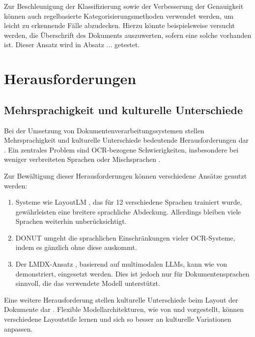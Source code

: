 Zur Beschleunigung der Klassifizierung sowie der Verbesserung der Genauigkeit können auch regelbasierte Kategorisierungsmethoden verwendet werden, um leicht zu erkennende Fälle abzudecken. Hierzu könnte beispielsweise versucht werden, die Überschrift des Dokuments auszuwerten, sofern eine solche vorhanden ist. Dieser Ansatz wird in Absatz ... getestet.

\section{Herausforderungen}
\label{sec:herausforderungen-und-offene-probleme}

\subsection{Mehrsprachigkeit und kulturelle Unterschiede}
\label{subsec:mehrsprachigkeit-und-kulturelle-unterschiede}

Bei der Umsetzung von Dokumentenverarbeitungssystemen stellen Mehrsprachigkeit und kulturelle Unterschiede bedeutende Herausforderungen dar \cite{XuYiheng2020LPoT, SubramaniNishant2021ASoD}. Ein zentrales Problem sind \gls{OCR}-bezogene Schwierigkeiten, insbesondere bei weniger verbreiteten Sprachen oder Mischsprachen \cite{OlejniczakKrzysztof2023TDFA}.

Zur Bewältigung dieser Herausforderungen können verschiedene Ansätze genutzt werden:

\begin{enumerate}
    \item Systeme wie LayoutLM \cite{XuYiheng2020LPoT}, das für 12 verschiedene Sprachen trainiert wurde, gewährleisten eine breitere sprachliche Abdeckung. Allerdings bleiben viele Sprachen weiterhin unberücksichtigt.
    
    \item \gls{DONUT} \cite{KimGeewook2022ODUT} umgeht die sprachlichen Einschränkungen vieler \gls{OCR}-Systeme, indem es gänzlich ohne diese auskommt.
    
    \item Der \gls{LMDX}-Ansatz \cite{PerotVincent2024LLMD}, basierend auf multimodalen \glspl{LLM}, kann wie von \textcite{BiswasAnjanava2024RoSD} demonstriert, eingesetzt werden. Dies ist jedoch nur für Dokumentensprachen sinnvoll, die das verwendete Modell unterstützt.
\end{enumerate}

Eine weitere Herausforderung stellen kulturelle Unterschiede beim Layout der Dokumente dar \cite{KimGeewook2022ODUT}. Flexible Modellarchitekturen, wie von  \textcite{KimGeewook2022ODUT} und \textcite{PerotVincent2024LLMD} vorgestellt, können verschiedene Layoutstile lernen und sich so besser an kulturelle Variationen anpassen.


